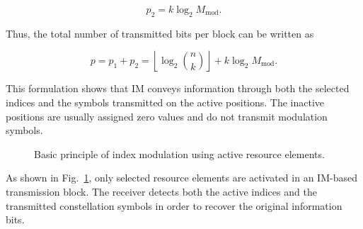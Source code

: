 \begin{equation}
p_2 = k \log_2 M_{\mathrm{mod}}.
\end{equation}

Thus, the total number of transmitted bits per block can be written as

\begin{equation}
p = p_1 + p_2
=
\left\lfloor \log_2 \binom{n}{k} \right\rfloor
+
k \log_2 M_{\mathrm{mod}}.
\end{equation}

This formulation shows that IM conveys information through both the selected indices and the symbols transmitted on the active positions. The inactive positions are usually assigned zero values and do not transmit modulation symbols.

\begin{figure}[H]
\centering


\caption{Basic principle of index modulation using active resource elements.}
\label{fig:index_modulation_principle}
\end{figure}

As shown in Fig.~\ref{fig:index_modulation_principle}, only selected resource elements are activated in an IM-based transmission block. The receiver detects both the active indices and the transmitted constellation symbols in order to recover the original information bits.

